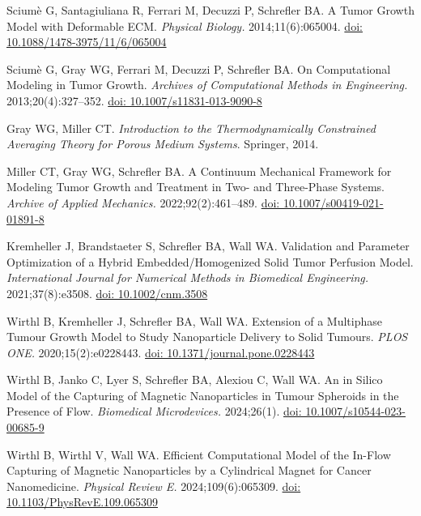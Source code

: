 \documentclass[Times1COL,AMA]{WileyNJDv5} %
\begin{document}
\begin{thebibliography}{10}
    Scium{\`e} G, Santagiuliana R, Ferrari M, Decuzzi P, Schrefler BA. A Tumor
    Growth Model with Deformable {{ECM}}. {\it Physical Biology.}
    2014\string;11(6)\string:065004.
    \newblock \href {\doibase 10.1088/1478-3975/11/6/065004} {doi:
        10.1088/1478-3975/11/6/065004}

    Scium{\`e} G, Gray WG, Ferrari M, Decuzzi P, Schrefler BA. On {{Computational
                    Modeling}} in {{Tumor Growth}}. {\it Archives of Computational Methods in
    Engineering.} 2013\string;20(4)\string:327--352.
    \newblock \href {\doibase 10.1007/s11831-013-9090-8} {doi:
        10.1007/s11831-013-9090-8}

    Gray WG, Miller CT. {\it Introduction to the {{Thermodynamically Constrained
                            Averaging Theory}} for {{Porous Medium Systems}}}.
    \newblock Springer, 2014.

    Miller CT, Gray WG, Schrefler BA. A Continuum Mechanical Framework for Modeling
    Tumor Growth and Treatment in Two- and Three-Phase Systems. {\it Archive of
            Applied Mechanics.} 2022\string;92(2)\string:461--489.
    \newblock \href {\doibase 10.1007/s00419-021-01891-8} {doi:
        10.1007/s00419-021-01891-8}

    Kremheller J, Brandstaeter S, Schrefler BA, Wall WA. Validation and Parameter
    Optimization of a Hybrid Embedded/Homogenized Solid Tumor Perfusion Model.
        {\it International Journal for Numerical Methods in Biomedical Engineering.}
    2021\string;37(8)\string:e3508.
    \newblock \href {\doibase 10.1002/cnm.3508} {doi: 10.1002/cnm.3508}

    Wirthl B, Kremheller J, Schrefler BA, Wall WA. Extension of a Multiphase Tumour
    Growth Model to Study Nanoparticle Delivery to Solid Tumours. {\it PLOS ONE.}
    2020\string;15(2)\string:e0228443.
    \newblock \href {\doibase 10.1371/journal.pone.0228443} {doi:
        10.1371/journal.pone.0228443}

    Wirthl B, Janko C, Lyer S, Schrefler BA, Alexiou C, Wall WA. An in Silico Model
    of the Capturing of Magnetic Nanoparticles in Tumour Spheroids in the
    Presence of Flow. {\it Biomedical Microdevices.} 2024\string;26(1).
    \newblock \href {\doibase 10.1007/s10544-023-00685-9} {doi:
        10.1007/s10544-023-00685-9}

    Wirthl B, Wirthl V, Wall WA. Efficient Computational Model of the In-Flow
    Capturing of Magnetic Nanoparticles by a Cylindrical Magnet for Cancer
    Nanomedicine. {\it Physical Review E.} 2024\string;109(6)\string:065309.
    \newblock \href {\doibase 10.1103/PhysRevE.109.065309} {doi:
        10.1103/PhysRevE.109.065309}


\end{thebibliography}
\end{document}
